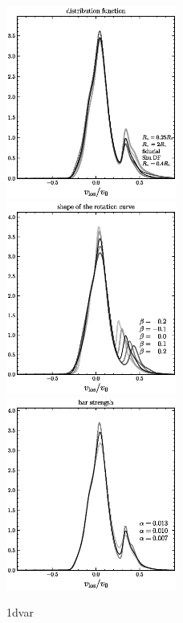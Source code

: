\documentclass[12pt,preprint]{aastex}
\begin{document}
\clearpage
\begin{figure}
\includegraphics[width=0.5\textwidth]{df.ps}\\
\includegraphics[width=0.5\textwidth]{slope.ps}
\includegraphics[width=0.5\textwidth]{barstrength.ps}
\caption{1dvar}\label{fig:1dvar}
\end{figure}
\end{document}
